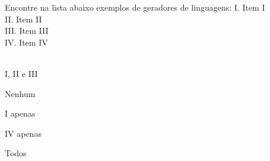 \question[10]
Encontre na lista abaixo exemplos de geradores de linguagens:
I. Item I\\
II. Item II\\
III. Item III\\
IV. Item IV\\
\\
\begin{choices}
\item I, II e III
\item Nenhum
\item I apenas %
\item IV apenas
\item Todos
\end{choices}
\answerline

